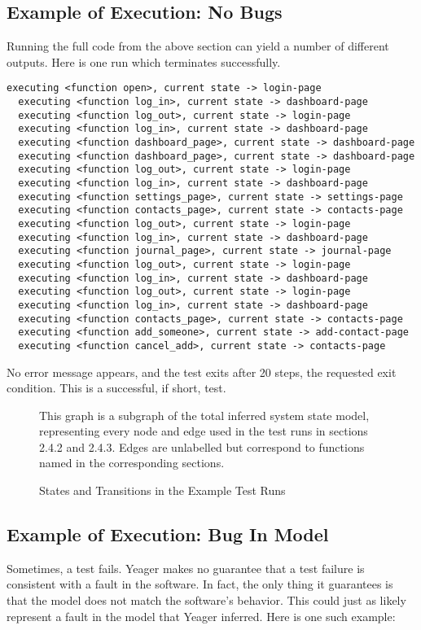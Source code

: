 \subsection{Example of Execution: No Bugs}
Running the full code from the above section can yield a number of different outputs. Here is one run which terminates successfully.

\begin{Verbatim}[fontsize=\small, baselinestretch=0.75]
  executing <function open>, current state -> login-page
  executing <function log_in>, current state -> dashboard-page
  executing <function log_out>, current state -> login-page
  executing <function log_in>, current state -> dashboard-page
  executing <function dashboard_page>, current state -> dashboard-page
  executing <function dashboard_page>, current state -> dashboard-page
  executing <function log_out>, current state -> login-page
  executing <function log_in>, current state -> dashboard-page
  executing <function settings_page>, current state -> settings-page
  executing <function contacts_page>, current state -> contacts-page
  executing <function log_out>, current state -> login-page
  executing <function log_in>, current state -> dashboard-page
  executing <function journal_page>, current state -> journal-page
  executing <function log_out>, current state -> login-page
  executing <function log_in>, current state -> dashboard-page
  executing <function log_out>, current state -> login-page
  executing <function log_in>, current state -> dashboard-page
  executing <function contacts_page>, current state -> contacts-page
  executing <function add_someone>, current state -> add-contact-page
  executing <function cancel_add>, current state -> contacts-page
\end{Verbatim}

No error message appears, and the test exits after 20 steps, the requested exit condition. This is a successful, if short, test.

\begin{figure}[h]
\noindent{}
\caption{States and Transitions in the Example Test Runs}
This graph is a subgraph of the total inferred system state model, representing every node and edge used in the test runs in sections 2.4.2 and 2.4.3. Edges are unlabelled but correspond to functions named in the corresponding sections.
\end{figure}


\subsection{Example of Execution: Bug In Model}
Sometimes, a test fails. Yeager makes no guarantee that a test failure is consistent with a fault in the software. In fact, the only thing it guarantees is that the model does not match the software's behavior. This could just as likely represent a fault in the model that Yeager inferred. Here is one such example:

